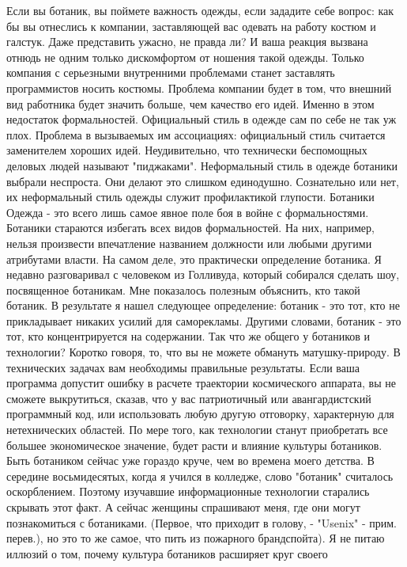 \documentclass[ebook,12pt,oneside,openany]{memoir}
\begin{document}
Если вы ботаник, вы поймете важность одежды, если зададите себе
вопрос: как бы вы отнеслись к компании, заставляющей вас одевать на
работу костюм и галстук. Даже представить ужасно, не правда ли? И ваша
реакция вызвана отнюдь не одним только дискомфортом от ношения такой
одежды. Только компания с серьезными внутренними проблемами станет
заставлять программистов носить костюмы. Проблема компании будет в
том, что внешний вид работника будет значить больше, чем качество его
идей. Именно в этом недостаток формальностей. Официальный стиль в
одежде сам по себе не так уж плох. Проблема в вызываемых им
ассоциациях: официальный стиль считается заменителем хороших идей.
Неудивительно, что технически беспомощных деловых людей называют
"пиджаками". Неформальный стиль в одежде ботаники выбрали неспроста.
Они делают это слишком единодушно. Сознательно или нет, их
неформальный стиль одежды служит профилактикой глупости. Ботаники
Одежда - это всего лишь самое явное поле боя в войне с формальностями.
Ботаники стараются избегать всех видов формальностей. На них,
например, нельзя произвести впечатление названием должности или любыми
другими атрибутами власти. На самом деле, это практически определение
ботаника. Я недавно разговаривал с человеком из Голливуда, который
собирался сделать шоу, посвященное ботаникам. Мне показалось полезным
объяснить, кто такой ботаник. В результате я нашел следующее
определение: ботаник - это тот, кто не прикладывает никаких усилий для
саморекламы. Другими словами, ботаник - это тот, кто концентрируется
на содержании. Так что же общего у ботаников и технологии? Коротко
говоря, то, что вы не можете обмануть матушку-природу. В технических
задачах вам необходимы правильные результаты. Если ваша программа
допустит ошибку в расчете траектории космического аппарата, вы не
сможете выкрутиться, сказав, что у вас патриотичный или
авангардистский программный код, или использовать любую другую
отговорку, характерную для нетехнических областей. По мере того, как
технологии станут приобретать все большее экономическое значение,
будет расти и влияние культуры ботаников. Быть ботаником сейчас уже
гораздо круче, чем во времена моего детства. В середине восьмидесятых,
когда я учился в колледже, слово "ботаник" считалось оскорблением.
Поэтому изучавшие информационные технологии старались скрывать этот
факт. А сейчас женщины спрашивают меня, где они могут познакомиться с
ботаниками. (Первое, что приходит в голову, - "Usenix" - прим.
перев.), но это то же самое, что пить из пожарного брандспойта). Я не
питаю иллюзий о том, почему культура ботаников расширяет круг своего
\end{document}
